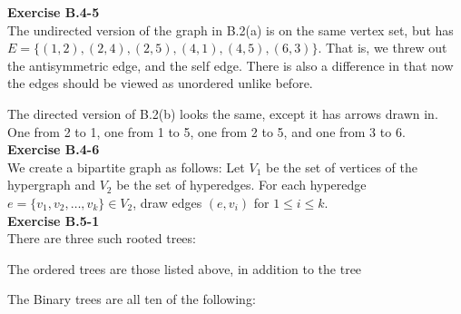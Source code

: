 \documentclass{article}
\begin{document}
\noindent\textbf{Exercise B.4-5}\\
The undirected version of the graph in B.2(a) is on the same vertex set, but has $E =\{(1,2),(2,4),(2,5),(4,1),(4,5),(6,3)\}$. That is, we threw out the antisymmetric edge, and the self edge. There is also a difference in that now the edges should be viewed as unordered unlike before.

The directed version of B.2(b) looks the same, except it has arrows drawn in. One from 2 to 1, one from 1 to 5, one from 2 to 5, and one from 3 to 6.\\

\noindent\textbf{Exercise B.4-6}\\

We create a bipartite graph as follows:  Let $V_1$ be the set of vertices of the hypergraph and $V_2$ be the set of hyperedges.  For each hyperedge $e = \{v_1, v_2, \ldots, v_k\} \in V_2$, draw edges $(e,v_i)$ for $1 \leq i \leq k$.  \\


\noindent\textbf{Exercise B.5-1}\\
There are three such rooted trees:


The ordered trees are those listed above, in addition to the tree


The Binary trees are all ten of the following:
\end{document}
